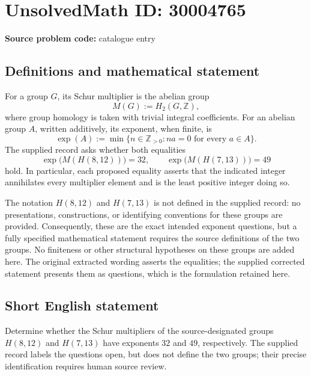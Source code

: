 \documentclass[11pt]{article}
\newcommand{\Z}{\mathbb{Z}}
\begin{document}
\section*{UnsolvedMath ID: 30004765}
\textbf{Source problem code:} catalogue entry
\subsection{Definitions and mathematical statement}
For a group \(G\), its Schur multiplier is the abelian group
\[
M(G):=H_2(G,\Z),
\]
where group homology is taken with trivial integral coefficients. For an abelian group \(A\), written additively, its exponent, when finite, is
\[
\exp(A):=\min\{n\in\Z_{>0}:na=0\text{ for every }a\in A\}.
\]
The supplied record asks whether both equalities
\[
\exp\bigl(M(H(8,12))\bigr)=32,
\qquad
\exp\bigl(M(H(7,13))\bigr)=49
\]
hold. In particular, each proposed equality asserts that the indicated integer annihilates every multiplier element and is the least positive integer doing so.

The notation \(H(8,12)\) and \(H(7,13)\) is not defined in the supplied record: no presentations, constructions, or identifying conventions for these groups are provided. Consequently, these are the exact intended exponent questions, but a fully specified mathematical statement requires the source definitions of the two groups. No finiteness or other structural hypotheses on these groups are added here. The original extracted wording asserts the equalities; the supplied corrected statement presents them as questions, which is the formulation retained here.
\subsection{Short English statement}
Determine whether the Schur multipliers of the source-designated groups \(H(8,12)\) and \(H(7,13)\) have exponents \(32\) and \(49\), respectively. The supplied record labels the questions open, but does not define the two groups; their precise identification requires human source review.
\end{document}
